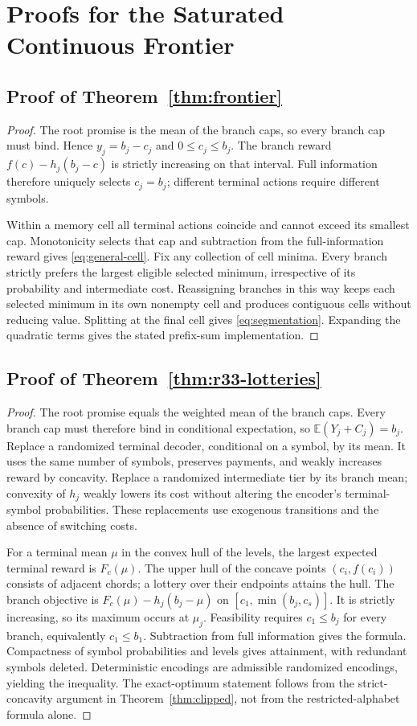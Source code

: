 \section{Proofs for the Saturated Continuous Frontier}
\subsection{Proof of Theorem~\ref{thm:frontier}}\label{ec-proof-thm-frontier}
\begin{proof}
The root promise is the mean of the branch caps, so every branch cap must bind. Hence $y_j=b_j-c_j$ and $0\leq c_j\leq b_j$. The branch reward $f(c)-h_j(b_j-c)$ is strictly increasing on that interval. Full information therefore uniquely selects $c_j=b_j$; different terminal actions require different symbols.

Within a memory cell all terminal actions coincide and cannot exceed its smallest cap. Monotonicity selects that cap and subtraction from the full-information reward gives \eqref{eq:general-cell}. Fix any collection of cell minima. Every branch strictly prefers the largest eligible selected minimum, irrespective of its probability and intermediate cost. Reassigning branches in this way keeps each selected minimum in its own nonempty cell and produces contiguous cells without reducing value. Splitting at the final cell gives \eqref{eq:segmentation}. Expanding the quadratic terms gives the stated prefix-sum implementation.
\end{proof}
\subsection{Proof of Theorem~\ref{thm:r33-lotteries}}\label{ec-proof-thm-r33-lotteries}
\begin{proof}
The root promise equals the weighted mean of the branch caps. Every branch cap must therefore bind in conditional expectation, so $\mathbb E(Y_j+C_j)=b_j$. Replace a randomized terminal decoder, conditional on a symbol, by its mean. It uses the same number of symbols, preserves payments, and weakly increases reward by concavity. Replace a randomized intermediate tier by its branch mean; convexity of $h_j$ weakly lowers its cost without altering the encoder's terminal-symbol probabilities. These replacements use exogenous transitions and the absence of switching costs.

For a terminal mean $\mu$ in the convex hull of the levels, the largest expected terminal reward is $F_c(\mu)$. The upper hull of the concave points $(c_i,f(c_i))$ consists of adjacent chords; a lottery over their endpoints attains the hull. The branch objective is $F_c(\mu)-h_j(b_j-\mu)$ on $[c_1,\min(b_j,c_s)]$. It is strictly increasing, so its maximum occurs at $\mu_j$. Feasibility requires $c_1\leq b_j$ for every branch, equivalently $c_1\leq b_1$. Subtraction from full information gives the formula. Compactness of symbol probabilities and levels gives attainment, with redundant symbols deleted. Deterministic encodings are admissible randomized encodings, yielding the inequality. The exact-optimum statement follows from the strict-concavity argument in Theorem~\ref{thm:clipped}, not from the restricted-alphabet formula alone.
\end{proof}

